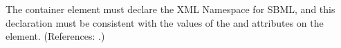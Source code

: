 The  container element must declare the XML Namespace
for SBML, and this declaration must be consistent with the values
of the  and  attributes on the 
 element.  (References: .)
